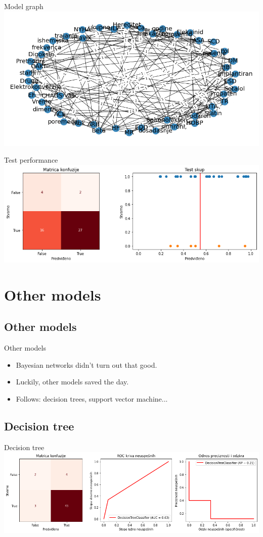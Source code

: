 \documentclass[hyperref={bookmarks=false}]{beamer}
\begin{document}
\begin{frame}{Model graph}
\includegraphics[width=\textwidth]{../slike/fixed1.png}
\end{frame}

\begin{frame}{Test performance}
\includegraphics[width=\textwidth]{../slike/fixed2.png}
\end{frame}

\section{Other models}
\subsection{Other models}
\begin{frame}{Other models}
\begin{itemize}
    \item Bayesian networks didn't turn out that good.
    \item Luckily, other models saved the day.
    \item Follows: decision trees, support vector machine...
\end{itemize}
\end{frame}

\subsection{Decision tree}
\begin{frame}{Decision tree}
\includegraphics[width=\textwidth]{../slike/tree.png}
\end{frame}
\end{document}
